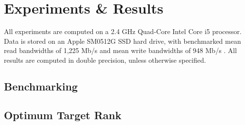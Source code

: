 \chapter{Experiments \& Results}\label{chpt:3}
All experiments are computed on a 2.4 GHz Quad-Core Intel Core i5 processor.
Data is stored on an Apple SM0512G SSD hard drive, with benchmarked mean read bandwidths
of 1,225 Mb/s and mean write bandwidths of 948 Mb/s \cite{ssd_benchmark}. All results are computed
in double precision, unless otherwise specified.

\section{Benchmarking}\label{sec:3_1_benchmarking}


\section{Optimum Target Rank}\label{sec:3_2_svd_params}
